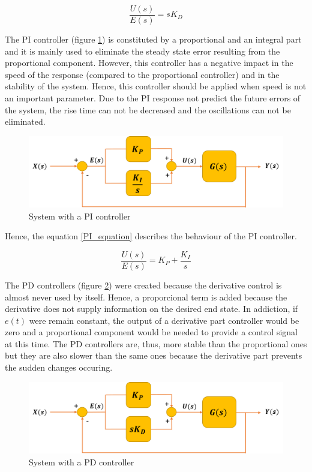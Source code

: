 \begin{equation}\label{deri_relation}
\frac{U(s)}{E(s)}= sK_D
\end{equation}

The PI controller (figure \ref{PI_controller}) is constituted by a proportional and an integral part and it is mainly used to eliminate the steady state error resulting from the proportional component. However, this controller has a negative impact in the speed of the response (compared to the proportional controller) and in the stability of the system. Hence, this controller should be applied when speed is not an important parameter. Due to the PI response not predict the future errors of the system, the rise time can not be decreased and the oscillations can not be eliminated.

\begin{figure}[H]
	\centering
	\includegraphics[scale=0.6]{figures/PI_controller.png}
	\caption{System with a PI controller}
	\label{PI_controller}
\end{figure}

Hence, the equation \ref{PI_equation} describes the behaviour of the PI controller.

\begin{equation}\label{PI_equation}
\frac{U(s)}{E(s)}= K_P + \frac{K_I}{s}
\end{equation}

The PD controllers (figure \ref{PD_controller}) were created because the derivative control is almost never used by itself. Hence, a proporcional term is added because the derivative does not supply information on the desired end state. In addiction, if $e(t)$ were remain constant, the output of a derivative part controller would be zero and a proportional component would be needed to provide a control signal at this time. The PD controllers are, thus, more stable than the proportional ones but they are also slower than the same ones because the derivative part prevents the sudden changes occuring.

\begin{figure}[H]
	\centering
	\includegraphics[scale=0.6]{figures/PD_controller.png}
	\caption{System with a PD controller}
	\label{PD_controller}
\end{figure}

